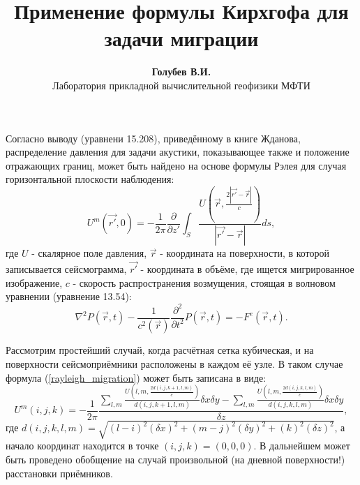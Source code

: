 \documentclass{article}
\begin{document}
\title{Применение формулы Кирхгофа для задачи миграции}
\author{\textbf{Голубев В.И.} \\ Лаборатория прикладной вычислительной геофизики МФТИ}
\maketitle
Согласно выводу (уравнени 15.208), приведённому в книге Жданова, распределение давления для
задачи акустики, показывающее также и положение отражающих границ,
может быть найдено на основе формулы Рэлея для случая горизонтальной плоскости
наблюдения:
\begin{equation}
\label{rayleigh_migration}
U^m(\vec{r'},0) = -\frac{1}{2\pi}\frac{\partial}{\partial z'}
	\int_S \frac{U(\vec{r},\frac{2|\vec{r'}-\vec{r}|}{c})}{|\vec{r'}-\vec{r}|}ds,
\end{equation}
где $U$ - скалярное поле давления, $\vec{r}$ - координата на поверхности, в которой записывается
сейсмограмма, $\vec{r'}$ - координата в объёме, где ищется мигрированное изображение, $c$ - скорость распространения возмущения, стоящая в волновом уравнении (уравнение 13.54):
\begin{equation}
\label{wave_equation}
\nabla^2P(\vec{r},t) - \frac{1}{c^2(\vec{r})}\frac{\partial^2}{\partial t^2}
	P(\vec{r},t) = - F^e(\vec{r},t).
\end{equation}

Рассмотрим простейший случай, когда расчётная сетка кубическая, и на поверхности сейсмоприёмники расположены в каждом её узле.
В таком случае формула (\ref{rayleigh_migration}) может быть записана в виде:
\begin{equation}
\label{rayleigh_migration_discrete}
U^m(i,j,k) = -\frac{1}{2\pi}\frac{\sum\limits_{l,m} \frac{U(l,m,\frac{2d(i,j,k+1,l,m)}{c})}{d(i,j,k+1,l,m)}\delta x \delta y - \sum\limits_{l,m} \frac{U(l,m,\frac{2d(i,j,k,l,m)}{c})}{d(i,j,k,l,m)}\delta x \delta y}{\delta z},
\end{equation}
где $d(i,j,k,l,m)=\sqrt{(l-i)^2(\delta x)^2 + (m-j)^2(\delta y)^2  + (k)^2(\delta z)^2}$, а начало координат находится в точке $(i,j,k)=(0,0,0)$.
В дальнейшем может быть проведено обобщение на случай произвольной (на дневной поверхности!) расстановки приёмников.
\end{document}
